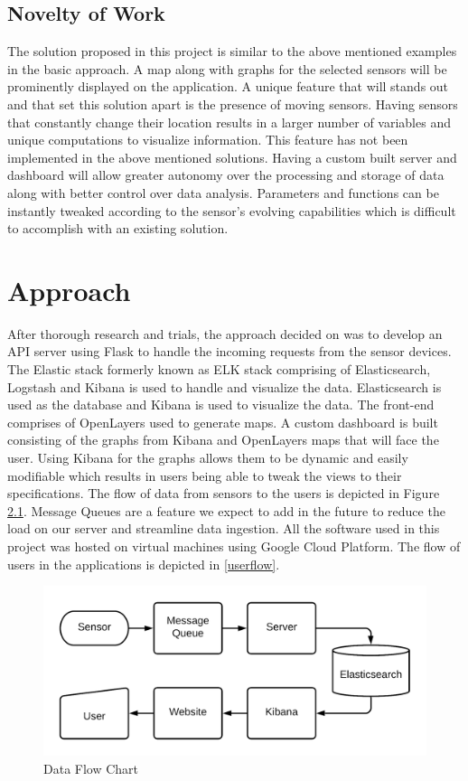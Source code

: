 \documentclass[]{report}
\begin{document}
\section{Novelty of Work}
The solution proposed in this project is similar to the above mentioned examples in the basic approach. A map along with graphs for the selected sensors will be prominently displayed on the application. A unique feature that will stands out and that set this solution apart is the presence of moving sensors. Having sensors that constantly change their location results in a larger number of variables and unique computations to visualize information. This feature has not been implemented in the above mentioned solutions. Having a custom built server and dashboard will allow greater autonomy over the processing and storage of data along with better control over data analysis. Parameters and functions can be instantly tweaked according to the sensor's evolving capabilities which is difficult to accomplish with an existing solution.



\chapter{Approach}
After thorough research and trials, the approach decided on was to develop an API server using Flask to handle the incoming requests from the sensor devices. The Elastic stack formerly known as ELK stack comprising of Elasticsearch, Logstash and Kibana is used to handle and visualize the data. Elasticsearch is used as the database and Kibana is used to visualize the data. The front-end comprises of OpenLayers used to generate maps. A custom dashboard is built consisting of the graphs from Kibana and OpenLayers maps that will face the user. Using Kibana for the graphs allows them to be dynamic and easily modifiable which results in users being able to tweak the views to their specifications. The flow of data from sensors to the users is depicted in Figure \ref{dataflow}. Message Queues are a feature we expect to add in the future to reduce the load on our server and streamline data ingestion. All the software used in this project was hosted on virtual machines using Google Cloud Platform. The flow of users in the applications is depicted in \ref{userflow}.

\begin{figure}[ht]
  \includegraphics[width =\columnwidth]{dataflow.png}
  \caption{Data Flow Chart}
  \label{dataflow}
\end{figure}
\end{document}
